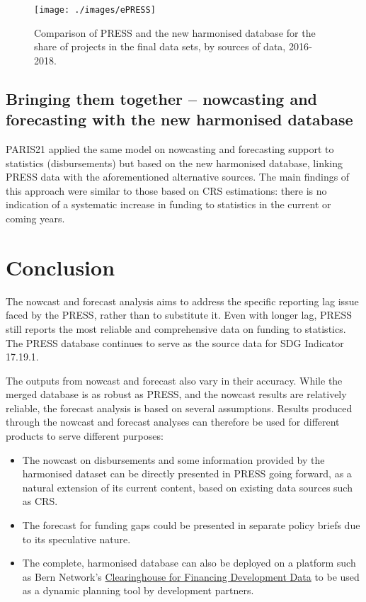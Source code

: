 \documentclass[
]{article}
\providecommand{\tightlist}{%
  \setlength{\itemsep}{0pt}\setlength{\parskip}{0pt}}
\begin{document}
\begin{figure}

{\centering \texttt{[image: ./images/ePRESS]} 

}

\caption{Comparison of PRESS and the new harmonised database for the share of projects in the final data sets, by sources of data, 2016‐2018.}\label{fig:ePRESS}
\end{figure}

\hypertarget{bringing-them-together-nowcasting-and-forecasting-with-the-new-harmonised-database}{%
\subsection{Bringing them together -- nowcasting and forecasting with the new harmonised database}\label{bringing-them-together-nowcasting-and-forecasting-with-the-new-harmonised-database}}

PARIS21 applied the same model on nowcasting and forecasting support to statistics (disbursements)
but based on the new harmonised database, linking PRESS data with the aforementioned alternative
sources. The main findings of this approach were similar to those based on CRS estimations: there is
no indication of a systematic increase in funding to statistics in the current or coming years.

\hypertarget{conclusion}{%
\section{Conclusion}\label{conclusion}}

The nowcast and forecast analysis aims to address the specific reporting lag issue faced by the PRESS,
rather than to substitute it. Even with longer lag, PRESS still reports the most reliable and
comprehensive data on funding to statistics. The PRESS database continues to serve as the source data
for SDG Indicator 17.19.1.

The outputs from nowcast and forecast also vary in their accuracy. While the merged database is as
robust as PRESS, and the nowcast results are relatively reliable, the forecast analysis is based on
several assumptions. Results produced through the nowcast and forecast analyses can therefore be
used for different products to serve different purposes:

\begin{itemize}
\tightlist
\item
  The nowcast on disbursements and some information provided by the harmonised dataset
  can be directly presented in PRESS going forward, as a natural extension of its current
  content, based on existing data sources such as CRS.
\item
  The forecast for funding gaps could be presented in separate policy briefs due to its
  speculative nature.
\item
  The complete, harmonised database can also be deployed on a platform such as Bern
  Network's \href{https://smartdatafinance.org}{Clearinghouse for Financing Development Data} to be used as a dynamic
  planning tool by development partners.
\end{itemize}
\end{document}
